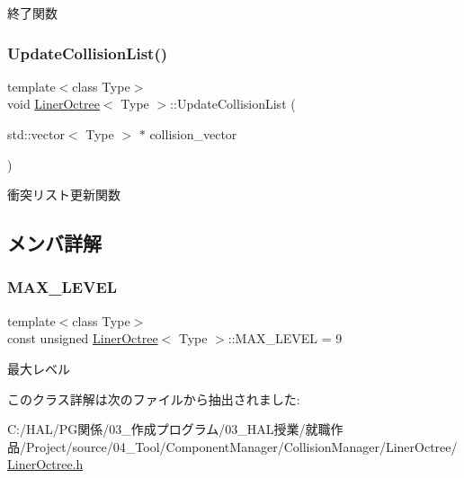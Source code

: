 終了関数 

\mbox{\label{class_liner_octree_a880276cc9099c29f447f3ca0043b9ce9}} 
\subsubsection{\texorpdfstring{Update\+Collision\+List()}{UpdateCollisionList()}}
{\footnotesize\ttfamily template$<$class Type$>$ \\
void \mbox{\hyperlink{class_liner_octree}{Liner\+Octree}}$<$ Type $>$\+::Update\+Collision\+List (\begin{DoxyParamCaption}\item[{std\+::vector$<$ Type $>$ $\ast$}]{collision\+\_\+vector }\end{DoxyParamCaption})\hspace{0.3cm}{\ttfamily [inline]}}



衝突リスト更新関数 



\subsection{メンバ詳解}
\mbox{\label{class_liner_octree_aced865f2822181486eb805e4db1f0a32}} 
\subsubsection{\texorpdfstring{M\+A\+X\+\_\+\+L\+E\+V\+EL}{MAX\_LEVEL}}
{\footnotesize\ttfamily template$<$class Type$>$ \\
const unsigned \mbox{\hyperlink{class_liner_octree}{Liner\+Octree}}$<$ Type $>$\+::M\+A\+X\+\_\+\+L\+E\+V\+EL = 9\hspace{0.3cm}{\ttfamily [static]}}



最大レベル 



このクラス詳解は次のファイルから抽出されました\+:\begin{DoxyCompactItemize}
\item 
C\+:/\+H\+A\+L/\+P\+G関係/03\+\_\+作成プログラム/03\+\_\+\+H\+A\+L授業/就職作品/\+Project/source/04\+\_\+\+Tool/\+Component\+Manager/\+Collision\+Manager/\+Liner\+Octree/\mbox{\hyperlink{_liner_octree_8h}{Liner\+Octree.\+h}}\end{DoxyCompactItemize}
